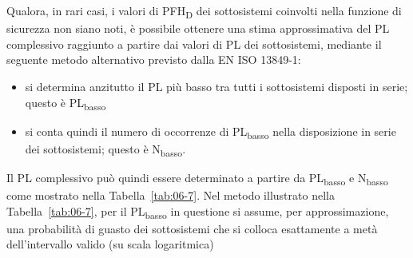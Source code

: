 Qualora, in rari casi, i valori di PFH\textsubscript{D} dei sottosistemi coinvolti nella funzione di sicurezza non siano noti, è possibile ottenere una stima approssimativa del PL complessivo raggiunto a partire dai valori di PL dei sottosistemi, mediante il seguente metodo alternativo previsto dalla EN ISO 13849-1:

\begin{itemize}
    \item si determina anzitutto il PL più basso tra tutti i sottosistemi disposti in serie; questo è PL\textsubscript{basso}
    \item si conta quindi il numero di occorrenze di PL\textsubscript{basso} nella disposizione in serie dei sottosistemi; questo è N\textsubscript{basso}. 
\end{itemize}

Il PL complessivo può quindi essere determinato a partire da PL\textsubscript{basso} e N\textsubscript{basso} come mostrato nella Tabella~\ref{tab:06-7}.
Nel metodo illustrato nella Tabella~\ref{tab:06-7}, per il PL\textsubscript{basso} in questione si assume, per approssimazione, una probabilità di guasto dei sottosistemi che si colloca esattamente a metà dell'intervallo valido (su scala logaritmica)

